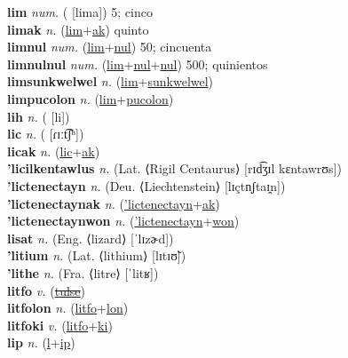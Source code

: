 \textbf{lim} \textit{num.} ( [lima])
5; cinco \label{lim} \\
\textbf{limak} \textit{n.} (\hyperref[lim]{lim}+\hyperref[ak]{ak})
quinto \label{limak} \\
\textbf{limnul} \textit{num.} (\hyperref[lim]{lim}+\hyperref[nul]{nul})
50; cincuenta \label{limnul} \\
\textbf{limnulnul} \textit{num.} (\hyperref[lim]{lim}+\hyperref[nul]{nul}+\hyperref[nul]{nul})
500; quinientos \label{limnulnul} \\
\textbf{limsunkwelwel} \textit{n.} (\hyperref[lim]{lim}+\hyperref[sunkwelwel]{sunkwelwel})
 \label{limsunkwelwel} \\
\textbf{limpucolon} \textit{n.} (\hyperref[lim]{lim}+\hyperref[pucolon]{pucolon})
 \label{limpucolon} \\
\textbf{lih} \textit{n.} ( [li])
 \label{lih} \\
\textbf{lic} \textit{n.} ( [ɾɪːt͡ʃʰ])
 \label{lic} \\
\textbf{licak} \textit{n.} (\hyperref[lic]{lic}+\hyperref[ak]{ak})
 \label{licak} \\
\textbf{'licilkentawlus} \textit{n.} (Lat. ⟨Rigil Centaurus⟩ [rɪd͡ʒɪl kɛntawrʊs])
 \label{'licilkentawlus} \\
\textbf{'lictenectayn} \textit{n.} (Deu. ⟨Liechtenstein⟩ [lɪçtn̩ʃtaɪ̯n])
 \label{'lictenectayn} \\
\textbf{'lictenectaynak} \textit{n.} (\hyperref['lictenectayn]{'lictenectayn}+\hyperref[ak]{ak})
 \label{'lictenectaynak} \\
\textbf{'lictenectaynwon} \textit{n.} (\hyperref['lictenectayn]{'lictenectayn}+\hyperref[won]{won})
 \label{'lictenectaynwon} \\
\textbf{lisat} \textit{n.} (Eng. ⟨lizard⟩ [ˈlɪzɚd])
 \label{lisat} \\
\textbf{'litium} \textit{n.} (Lat. ⟨lithium⟩ [lɪtɪʊ̃])
 \label{'litium} \\
\textbf{'lithe} \textit{n.} (Fra. ⟨litre⟩ [ˈlitʁ])
 \label{'lithe} \\
\textbf{litfo} \textit{v.} (\hyperref[tulse]{\sout{tulse}})
 \label{litfo} \\
\textbf{litfolon} \textit{n.} (\hyperref[litfo]{litfo}+\hyperref[lon]{lon})
 \label{litfolon} \\
\textbf{litfoki} \textit{v.} (\hyperref[litfo]{litfo}+\hyperref[ki]{ki})
 \label{litfoki} \\
\textbf{lip} \textit{n.} (\hyperref[l]{l}+\hyperref[ip]{ip})
